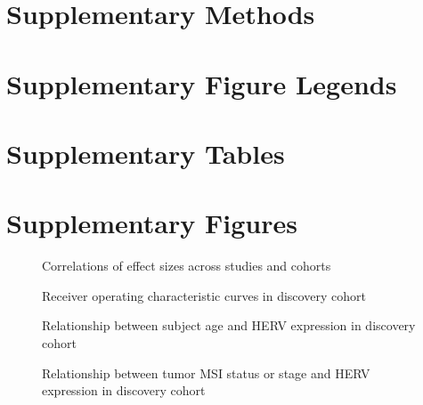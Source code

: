 \documentclass[11pt,letterpaper]{article}
\makeatletter
\renewcommand{\maketitle}{
        \begingroup
            \setlength{\parindent}{0pt}
            \begin{flushleft}
                \LARGE\textbf{\@title}
                \newline
                \newline
                \small\@author
            \end{flushleft}
        \endgroup
    }
\makeatother
\begin{document}
\maketitle

\newpage
\section*{Supplementary Methods}


\newpage



\newpage
\section*{Supplementary Figure Legends}


\newpage
\section*{Supplementary Tables}




\FloatBarrier
\newpage
\section*{Supplementary Figures}

\begin{figure}[ht]
  \caption{Correlations of effect sizes across studies and cohorts}
  \label{fig:corrs}
\end{figure}

\begin{figure}[ht]
  \caption{Receiver operating characteristic curves in discovery cohort}
  \label{fig:rocA}
\end{figure}

\begin{figure}[ht]
  \caption{Relationship between subject age and HERV expression in discovery cohort}
  \label{fig:age}
\end{figure}

\begin{figure}[ht]
  \caption{Relationship between tumor MSI status or stage and HERV expression in discovery cohort}
  \label{fig:msistage}
\end{figure}
\end{document}
